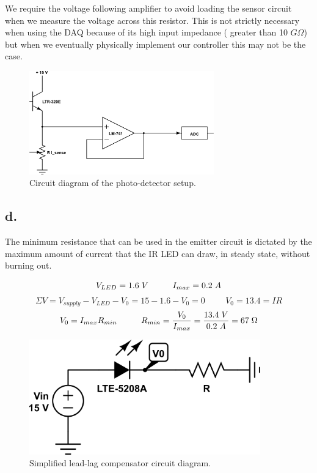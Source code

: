 \documentclass{article}
\theoremstyle{plain}
\theoremstyle{definition}
\theoremstyle{remark}
\begin{document}
We require the voltage following amplifier to avoid loading the sensor circuit when we measure the voltage across this resistor.  This is not strictly necessary when using the DAQ because of its high input impedance ( greater than 10 $G\Omega$) but when we eventually physically implement our controller this may not be the case.  


\begin{figure}[h]
\begin{center}
\includegraphics[width=8cm]{lab2_sensorckt.png}
\end{center}
\caption{Circuit diagram of the photo-detector setup.}
\label{q1_c}
\end{figure}


\subsection*{d.}
The minimum resistance that can be used in the emitter circuit is dictated by the maximum amount of current that the IR LED can draw, in steady state, without burning out.  

$$ V_{LED}=1.6 \hspace{0.1cm} V \hspace{1cm} I_{max} = 0.2 \hspace{0.1cm} A $$ 
$$ \Sigma{V} = V_{supply} - V_{LED} - V_0 = 15 - 1.6 - V_0 = 0 \hspace{1cm} V_0=13.4=IR $$
$$ V_0=I_{max}R_{min} \hspace{1cm} R_{min}=\frac{V_0}{I_{max}}=\frac{13.4 \hspace{0.1cm} V}{0.2 \hspace{0.1cm} A} = 67\hspace{0.1cm} \Omega$$


\begin{figure}[h]
\begin{center}
\includegraphics[width=10cm]{lab2_emitter.png}
\end{center}
\caption{Simplified lead-lag compensator circuit diagram.}
\label{q1_b}
\end{figure}
\end{document}
